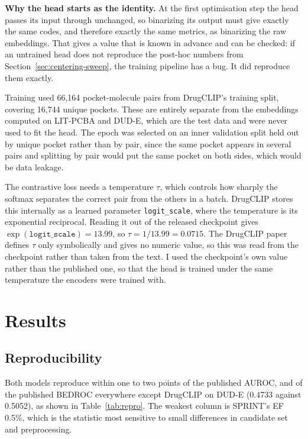 \documentclass[10pt,a4paper]{article}
\begin{document}
\textbf{Why the head starts as the identity.} At the first optimisation step the head passes
its input through unchanged, so binarizing its output must give exactly the same codes, and
therefore exactly the same metrics, as binarizing the raw embeddings. That gives a value that
is known in advance and can be checked: if an untrained head does not reproduce the post-hoc
numbers from Section~\ref{sec:centering-sweep}, the training pipeline has a bug. It did reproduce them exactly.

Training used 66,164 pocket-molecule pairs from DrugCLIP's training split, covering 16,744
unique pockets. These are entirely separate from the embeddings computed on LIT-PCBA and
DUD-E, which are the test data and were never used to fit the head. The epoch was selected on
an inner validation split held out by unique pocket rather than by pair, since the same pocket
appears in several pairs and splitting by pair would put the same pocket on both sides, which
would be data leakage.

The contrastive loss needs a temperature $\tau$, which controls how sharply the softmax
separates the correct pair from the others in a batch. DrugCLIP stores this internally as a
learned parameter \texttt{logit\_scale}, where the temperature is its exponential reciprocal.
Reading it out of the released checkpoint gives $\exp(\texttt{logit\_scale}) = 13.99$, so
$\tau = 1/13.99 = 0.0715$. The DrugCLIP paper defines $\tau$ only symbolically and gives no
numeric value, so this was read from the checkpoint rather than taken from the text. I
used the checkpoint's own value rather than the published one, so that the head is trained
under the same temperature the encoders were trained with.

\section{Results}\label{sec:results}

\subsection{Reproducibility}\label{sec:repro}
Both models reproduce within one to two points of the published AUROC, and of the published
BEDROC everywhere except DrugCLIP on DUD-E (0.4733 against 0.5052),
as shown in Table~\ref{tab:repro}. The weakest column is SPRINT's EF 0.5\%, which is the statistic most
sensitive to small differences in candidate set and preprocessing.
\end{document}
